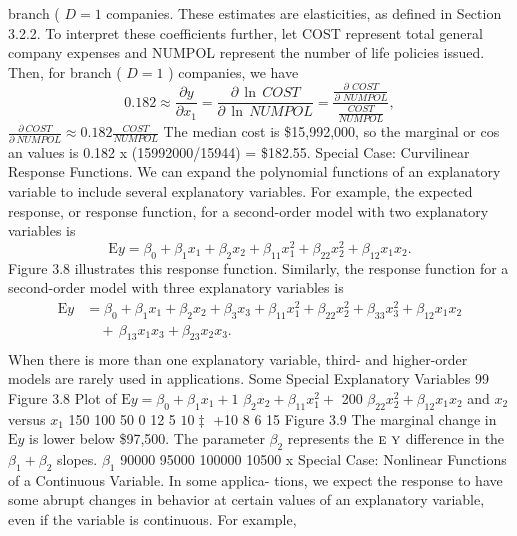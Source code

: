 \documentclass[11pt]{article}
\begin{document}
branch ( \(D=1\) companies.
These estimates are elasticities, as defined in Section 3.2.2. To interpret these
coefficients further, let COST represent total general company expenses and
 NUMPOL represent the number of life policies issued. Then, for branch ( \(D=1\) )
companies, we have
\[
0 . 1 8 2 \approx\frac{\partial y} {\partial x_{1}}=\frac{\partial\, \operatorname{l n} \, C O S T} {\partial\, \operatorname{l n} \, N U M P O L}=\frac{\frac{\partial\, \, C O S T} {\partial\, \, N U M P O L}} {\frac{C O S T} {N U M P O L}} ,
\]
\(\frac{\partial\ C O S T} {\partial\ N U M P O L} \approx0 . 1 8 2 \frac{C O S T} {N U M P O L}\) The median cost is \$15,992,000, so the marginal
or
cos an values is 0.182 x (15992000/15944) = \$182.55.
 Special Case: Curvilinear Response Functions. We can expand the polynomial
 functions of an explanatory variable to include several explanatory variables. For
example, the expected response, or response function, for a second-order model
with two explanatory variables is
\[
\mathrm{E} y=\beta_{0}+\beta_{1} x_{1}+\beta_{2} x_{2}+\beta_{1 1} x_{1}^{2}+\beta_{2 2} x_{2}^{2}+\beta_{1 2} x_{1} x_{2} .
\]
Figure 3.8 illustrates this response function. Similarly, the response function
for a second-order model with three explanatory variables is
\[
\begin{aligned} {\mathrm{E} y} & {{}=\beta_{0}+\beta_{1} x_{1}+\beta_{2} x_{2}+\beta_{3} x_{3}+\beta_{1 1} x_{1}^{2}+\beta_{2 2} x_{2}^{2}+\beta_{3 3} x_{3}^{2}+\beta_{1 2} x_{1} x_{2}} \\ {} & {{} \quad+\, \beta_{1 3} x_{1} x_{3}+\beta_{2 3} x_{2} x_{3} .} \\ \end{aligned}
\]
When there is more than one explanatory variable, third- and higher-order
 models are rarely used in applications.
 Some Special Explanatory Variables 99
Figure 3.8 Plot of
\(\textrm{E} y=\beta_{0}+\beta_{1} x_{1}+1\)
\(\beta_{2} x_{2}+\beta_{1 1} x_{1}^{2}+\)
200 \(\beta_{2 2} x_{2}^{2}+\beta_{1 2} x_{1} x_{2}\) and \(x_{2}\)
versus \(x_{1}\)
150
100
50
0 12
5 \(1 0 \ddag\)
+10 8
6
15
Figure 3.9 The
marginal change in
\(\textrm{E} y\) is lower below
\$97,500. The
 parameter \(\beta_{2}\)
represents the
\(\textsc{e y}\) difference in the
\(\beta_{1}+\beta_{2}\) slopes.
\(\beta_{1}\)
 90000 95000 100000 10500
x
 Special Case: Nonlinear Functions of a Continuous Variable. In some applica-
tions, we expect the response to have some abrupt changes in behavior at certain
 values of an explanatory variable, even if the variable is continuous. For example,
\end{document}
